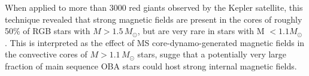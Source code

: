 When applied to more than 3000 red giants observed by the Kepler satellite, this technique revealed that strong magnetic fields are present in the cores of roughly 50\% of RGB stars with $M \! > \! 1.5 \, M_\odot$, but are very rare in stars with M $< 1.1M_\odot$ \citep{Stello_2016,Stello_2016a}. This is interpreted as the effect of MS core-dynamo-generated magnetic fields in the convective cores of $M \! > \! 1.1 \, M_\odot$ stars, sugge that a potentially very large fraction of main sequence OBA stars could host strong internal magnetic fields.



